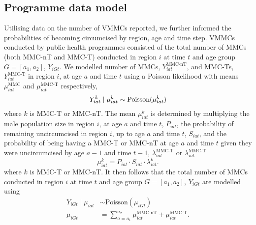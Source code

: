 \documentclass{article}
\begin{document}
\begin{appendix}

\subsection{Programme data model}


Utilising data on the number of VMMCs reported, we further informed the probabilities of becoming circumcised by region, age and time step. VMMCs conducted by public health programmes consisted of the total number of MMCs (both MMC-nT and MMC-T) conducted in region $i$ at time $t$ and age group $G=[a_1,a_2]$, $Y_{iGt}$. We modelled number of MMCs, $Y^{\text{MMC-nT}}_{iat}$, and MMC-Ts, $Y^{\text{MMC-T}}_{iat}$ in region $i$, at age $a$ and time $t$ using a Poisson likelihood with means $\mu^{\text{MMC}}_{iat}$ and $\mu^{\text{MMC-T}}_{iat}$ respectively,
\begin{equation*}
    Y^{k}_{iat} \;|\; \mu^{k}_{iat}\sim \text{Poisson}(\mu^{k}_{iat}) \\
	\label{eqn::VMMCPoisson}
\end{equation*}
where $k$ is MMC-T or MMC-nT. The mean $\mu^{k}_{iat}$ is determined by multiplying the male population size in region $i$, at age $a$ and time $t$, $P_{iat}$, the probability of remaining uncircumcised in region $i$, up to age $a$ and time $t$, $S_{iat}$, and the probability of being having a MMC-T or MMC-nT at age $a$ and time $t$ given they were uncircumcised by age $a-1$ and time $t-1$, $\lambda^{\text{MMC-T}}_{iat}$ or $\lambda^{\text{MMC-T}}_{iat}$
\begin{equation*}
    \mu^k_{iat} = P_{iat}\cdot S_{iat} \cdot \lambda^{k}_{iat}.
\end{equation*}
where $k$ is MMC-T or MMC-nT. 
\noindent It then follows that the total number of MMCs conducted in region $i$ at time $t$ and age group $G=[a_1,a_2]$, $Y_{iGt}$ are modelled using 
\begin{equation*}
	\begin{split}
		Y_{iGt} \;|\; \mu_{iat} &\sim \text{Poisson}(\mu_{iGt}) \\
		\mu_{iGt} &= \sum_{a = a_1}^{a_2} \mu^{\text{MMC-nT}}_{iat} + \mu^{\text{MMC-T}}_{iat}.
	\end{split}
\end{equation*}


\end{appendix}
\end{document}
